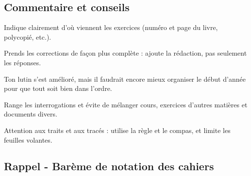 \documentclass[answers]{exam}
\begin{document}
\subsection*{Commentaire et conseils}

\begin{tcolorbox}[
  colback=blue!5!white,
  colframe=blue!70!black,
  title=Commentaire plus détaillé,
  fonttitle=\bfseries,
  boxsep=4pt,
  sharp corners,
]
\begin{compactitem}
  \item Indique clairement d'où viennent les exercices (numéro et page du livre, polycopié, etc.).
  \item Prends les corrections de façon plus complète : ajoute la rédaction, pas seulement les réponses.
  \item Ton lutin s'est amélioré, mais il faudrait encore mieux organiser le début d'année pour que tout soit bien dans l'ordre.
  \item Range les interrogations et évite de mélanger cours, exercices d'autres matières et documents divers.
  \item Attention aux traits et aux tracés : utilise la règle et le compas, et limite les feuilles volantes.
\end{compactitem}
\end{tcolorbox}



\subsection*{Rappel - Barème de notation des cahiers}

\renewcommand{\arraystretch}{1.7}
\end{document}
